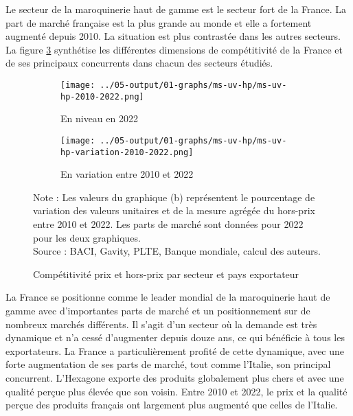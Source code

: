 \documentclass[french,10pt,a4paper]{article}
\begin{document}
Le secteur de la maroquinerie haut de gamme est le secteur fort de la France. La part de marché française est la plus grande au monde et elle a fortement augmenté depuis 2010. La situation est plus contrastée dans les autres secteurs. La figure \ref{fig:graph-synthese} synthétise les différentes dimensions de compétitivité de la France et de ses principaux concurrents dans chacun des secteurs étudiés. 

\begin{figure}[!h]
  \centering
  \begin{subfigure}{\textwidth}
    \centering    \texttt{[image: ../05-output/01-graphs/ms-uv-hp/ms-uv-hp-2010-2022.png]}
    \caption{En niveau en 2022}
    \label{fig:ms-uv-hp}
  \end{subfigure}
  \vspace{0.5cm}
  \begin{subfigure}{\textwidth}
    \centering \texttt{[image: ../05-output/01-graphs/ms-uv-hp/ms-uv-hp-variation-2010-2022.png]}
 \caption{En variation entre 2010 et 2022}
 \label{fig:ms-uv-hp-variation}
  \end{subfigure}
  \captionsetup{justification=justified, singlelinecheck=false, font=small}
  \caption*{Note : Les valeurs du graphique (b) représentent le pourcentage de variation des valeurs unitaires et de la mesure agrégée du hors-prix entre 2010 et 2022. Les parts de marché sont données pour 2022 pour les deux graphiques.\\
  Source : BACI, Gavity, PLTE, Banque mondiale, calcul des auteurs.}
  \captionsetup{justification=centering, singlelinecheck=true, font=normalsize}
  \caption{Compétitivité prix et hors-prix par secteur et pays exportateur}
  \label{fig:graph-synthese}
\end{figure}

\bigskip

La France se positionne comme le leader mondial de la maroquinerie haut de gamme avec d'importantes parts de marché et un positionnement sur de nombreux marchés différents. Il s'agit d'un secteur où la demande est très dynamique et n'a cessé d'augmenter depuis douze ans, ce qui bénéficie à tous les exportateurs. La France a particulièrement profité de cette dynamique, avec une forte augmentation de ses parts de marché, tout comme l'Italie, son principal concurrent. L'Hexagone exporte des produits globalement plus chers et avec une qualité perçue plus élevée que son voisin. Entre 2010 et 2022, le prix et la qualité perçue des produits français ont largement plus augmenté que celles de l'Italie.
\end{document}
